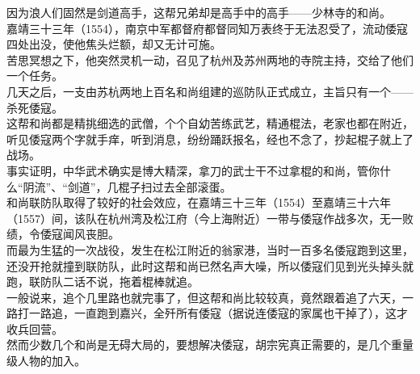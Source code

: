 \begin{multicols}{\theparacolNo}
因为浪人们固然是剑道高手，这帮兄弟却是高手中的高手——少林寺的和尚。\\

嘉靖三十三年（1554），南京中军都督府都督同知万表终于无法忍受了，流动倭寇四处出没，使他焦头烂额，却又无计可施。\\

苦思冥想之下，他突然灵机一动，召见了杭州及苏州两地的寺院主持，交给了他们一个任务。\\

几天之后，一支由苏杭两地上百名和尚组建的巡防队正式成立，主旨只有一个——杀死倭寇。\\

这帮和尚都是精挑细选的武僧，个个自幼苦练武艺，精通棍法，老家也都在附近，听见倭寇两个字就手痒，听到消息，纷纷踊跃报名，经也不念了，抄起棍子就上了战场。\\

事实证明，中华武术确实是博大精深，拿刀的武士干不过拿棍的和尚，管你什么“阴流”、“剑道”，几棍子扫过去全部滚蛋。\\

和尚联防队取得了较好的社会效应，在嘉靖三十三年（1554）至嘉靖三十六年（1557）间，该队在杭州湾及松江府（今上海附近）一带与倭寇作战多次，无一败绩，令倭寇闻风丧胆。\\

而最为生猛的一次战役，发生在松江附近的翁家港，当时一百多名倭寇跑到这里，还没开抢就撞到联防队，此时这帮和尚已然名声大噪，所以倭寇们见到光头掉头就跑，联防队二话不说，拖着棍棒就追。\\

一般说来，追个几里路也就完事了，但这帮和尚比较较真，竟然跟着追了六天，一路打一路追，一直跑到嘉兴，全歼所有倭寇（据说连倭寇的家属也干掉了），这才收兵回营。\\

然而少数几个和尚是无碍大局的，要想解决倭寇，胡宗宪真正需要的，是几个重量级人物的加入。\\
\ifnum{}
	\end{multicols}
\fi
\newpage

